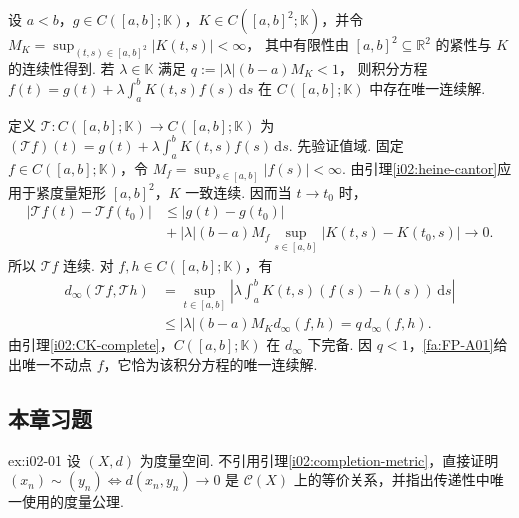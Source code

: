 \begin{FAApplication}[连续核积分方程]
设 \(\displaystyle a<b\)，\(\displaystyle g\in C([a,b];\mathbb K)\)，\(\displaystyle K\in C([a,b]^2;\mathbb K)\)，并令 \(\displaystyle M_K=\sup_{(t,s)\in[a,b]^2}|K(t,s)|<\infty\)，
其中有限性由 \(\displaystyle [a,b]^2\subseteq\mathbb R^2\) 的紧性与 \(\displaystyle K\) 的连续性得到.
若 \(\displaystyle \lambda\in\mathbb K\) 满足 \(\displaystyle q:=|\lambda|(b-a)M_K<1\)，
则积分方程 \(\displaystyle f(t)=g(t)+\lambda\int_a^b K(t,s)f(s)\,\mathrm{d}s\)
在 \(\displaystyle C([a,b];\mathbb K)\) 中存在唯一连续解.

定义 \(\displaystyle \mathcal T:C([a,b];\mathbb K)\to C([a,b];\mathbb K)\) 为 \(\displaystyle (\mathcal T f)(t)=g(t)+\lambda\int_a^b K(t,s)f(s)\,\mathrm{d}s\).
先验证值域. 固定 \(\displaystyle f\in C([a,b];\mathbb K)\)，令 \(\displaystyle M_f=\sup_{s\in[a,b]}|f(s)|<\infty\). 由引理\ref{i02:heine-cantor}应用于紧度量矩形 \(\displaystyle [a,b]^2\)，\(\displaystyle K\) 一致连续. 因而当 \(\displaystyle t\to t_0\) 时，
\[
\begin{aligned}
|\mathcal T f(t)-\mathcal T f(t_0)|
&\leqslant |g(t)-g(t_0)|\\
&{}+|\lambda|(b-a)M_f\sup_{s\in[a,b]}|K(t,s)-K(t_0,s)|\longrightarrow0.
\end{aligned}
\]
所以 \(\displaystyle \mathcal T f\) 连续. 对 \(\displaystyle f,h\in C([a,b];\mathbb K)\)，有
\[
\begin{aligned}
d_\infty(\mathcal T f,\mathcal T h)
&=\sup_{t\in[a,b]}\left|\lambda\int_a^b K(t,s)(f(s)-h(s))\,\mathrm{d}s\right|\\
&\leqslant |\lambda|(b-a)M_Kd_\infty(f,h)=q\,d_\infty(f,h).
\end{aligned}
\]
由引理\ref{i02:CK-complete}，\(\displaystyle C([a,b];\mathbb K)\) 在 \(\displaystyle d_\infty\) 下完备. 因 \(\displaystyle q<1\)，\autoref{fa:FP-A01}给出唯一不动点 \(\displaystyle f\)，它恰为该积分方程的唯一连续解.
\end{FAApplication}

\subsection{本章习题}\label{sec:i02-exercises}

\begin{FAExercise}[完备化中的等价关系]{ex:i02-01}
设 \(\displaystyle (X,d)\) 为度量空间. 不引用引理\ref{i02:completion-metric}，直接证明 \(\displaystyle (x_n)\sim(y_n)\iff d(x_n,y_n)\to0\) 是 \(\displaystyle \mathcal C(X)\) 上的等价关系，并指出传递性中唯一使用的度量公理.
\end{FAExercise}


